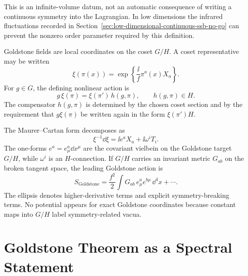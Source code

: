 This is an infinite-volume datum, not an automatic consequence of writing a
continuous symmetry into the Lagrangian.  In low dimensions the infrared
fluctuations recorded in
Section~\ref{sec:low-dimensional-continuous-ssb-no-go} can prevent the
nonzero order parameter required by this definition.

\begin{definition}
\label{def:goldstone-effective-action}
Goldstone fields are local coordinates on the coset \(G/H\).  A coset
representative may be written
\begin{equation}
  \xi(\pi(x))
  =
  \exp\left\{\frac{\ii}{f}\pi^a(x)X_a\right\}.
  \label{eq:goldstone-coset-coordinate}
\end{equation}
For \(g\in G\), the defining nonlinear action is
\begin{equation}
  g\,\xi(\pi)
  =
  \xi(\pi')\,h(g,\pi),
  \qquad
  h(g,\pi)\in H .
  \label{eq:ccwz-nonlinear-action}
\end{equation}
The compensator \(h(g,\pi)\) is determined by the chosen coset section and by
the requirement that \(g\xi(\pi)\) be written again in the form
\(\xi(\pi')H\).

The Maurer--Cartan form decomposes as
\begin{equation}
  \xi^{-1}\dd\xi
  =
  \ii e^a X_a+\ii\omega^i T_i .
  \label{eq:ccwz-maurer-cartan}
\end{equation}
The one-forms \(e^a=e^a_{\mu}\dd x^\mu\) are the covariant vielbein on the
Goldstone target \(G/H\), while \(\omega^i\) is an \(H\)-connection.  If
\(G/H\) carries an invariant metric \(G_{ab}\) on the broken tangent space, the
leading Goldstone action is
\begin{equation}
  S_{\mathrm{Goldstone}}
  =
  \frac{f^2}{2}
  \int G_{ab}\,
  e^a_\mu e^{b\mu}\,\dd^4x
  +\cdots .
  \label{eq:goldstone-leading-action}
\end{equation}
The ellipsis denotes higher-derivative terms and explicit symmetry-breaking
terms.  No potential appears for exact Goldstone coordinates because constant
maps into \(G/H\) label symmetry-related vacua.
\end{definition}

\section{Goldstone Theorem as a Spectral Statement}

